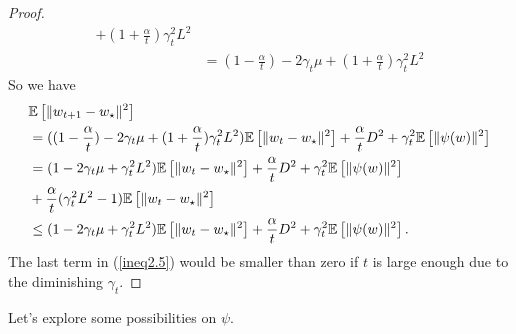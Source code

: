 \begin{proof}
\begin{align}
		+(1+\frac{\alpha}{t})\gamma_t^2 L^2\\
		&=(1-\frac{\alpha}{t}) - 2\gamma_t\mu + (1+\frac{\alpha}{t})\gamma_t^2 L^2
	\end{align}
	So we have
	\begin{align}
		\notag
		&\mathbb{E}\left[\|w_{t+1}-w_\star\|^2 \right]\\
		&=((1-\frac{\alpha}{t}) - 2\gamma_t\mu + (1+\frac{\alpha}{t})\gamma_t^2 L^2)
		\mathbb{E}\left[\|w_t-w_\star\|^2 \right]+\frac{\alpha}{t}D^2
		+\gamma_t^2 \mathbb{E} \left[ \|\psi(w)\|^2 \right]\\
		\notag
		&=(1-2\gamma_t\mu+\gamma_t^2L^2)\mathbb{E}\left[\|w_t-w_\star\|^2 \right]
		+\frac{\alpha}{t}D^2
		+\gamma_t^2 \mathbb{E} \left[ \|\psi(w)\|^2 \right]\\
		\label{ineq2.5}
		&+\frac{\alpha}{t}(\gamma_t^2L^2-1)\mathbb{E}\left[\|w_t-w_\star\|^2 \right]\\
		&\leq (1-2\gamma_t\mu+\gamma_t^2L^2)\mathbb{E}\left[\|w_t-w_\star\|^2 \right]
		+\frac{\alpha}{t}D^2
		+\gamma_t^2 \mathbb{E} \left[ \|\psi(w)\|^2 \right].
	\end{align}
	The last term in (\ref{ineq2.5}) would be smaller than zero if $t$ is large enough due to the diminishing $\gamma_t$.
\end{proof}

Let's explore some possibilities on $\psi$.


